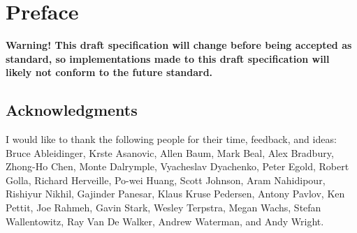 \chapter{Preface}

{\bf Warning! This draft specification will change before being accepted as
standard, so implementations made to this draft specification will likely not
conform to the future standard.}


\section*{Acknowledgments}

I would like to thank the following people for their time, feedback, and ideas:
Bruce Ableidinger,
Krste Asanovic,
Allen Baum,
Mark Beal,
Alex Bradbury,
Zhong-Ho Chen,
Monte Dalrymple,
Vyacheslav Dyachenko,
Peter Egold,
Robert Golla,
Richard Herveille,
Po-wei Huang,
Scott Johnson,
Aram Nahidipour,
Rishiyur Nikhil,
Gajinder Panesar,
Klaus Kruse Pedersen,
Antony Pavlov,
Ken Pettit,
Joe Rahmeh,
Gavin Stark,
Wesley Terpstra,
Megan Wachs,
Stefan Wallentowitz,
Ray Van De Walker,
Andrew Waterman,
and Andy Wright.
